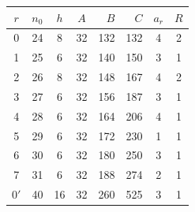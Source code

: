\begin{tabular}{@{}ccccrrcc@{}}
\toprule
$r$ & $n_0$ & $h$ & $A$ & $B$ & $C$ & $a_r$ & $R$ \\
\midrule
0 & 24 & 8 & 32 & 132 & 132 & 4 & 2 \\
1 & 25 & 6 & 32 & 140 & 150 & 3 & 1 \\
2 & 26 & 8 & 32 & 148 & 167 & 4 & 2 \\
3 & 27 & 6 & 32 & 156 & 187 & 3 & 1 \\
4 & 28 & 6 & 32 & 164 & 206 & 4 & 1 \\
5 & 29 & 6 & 32 & 172 & 230 & 1 & 1 \\
6 & 30 & 6 & 32 & 180 & 250 & 3 & 1 \\
7 & 31 & 6 & 32 & 188 & 274 & 2 & 1 \\
0$'$ & 40 & 16 & 32 & 260 & 525 & 3 & 1 \\
\bottomrule
\end{tabular}
